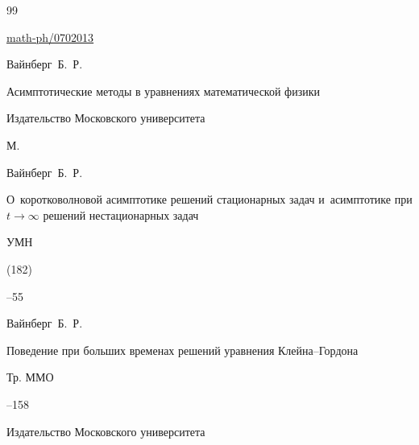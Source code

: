 \begin{thebibliography}{99}

\arxiv \href{https://arxiv.org/abs/math-ph/0702013}{math-ph/0702013}




\by Вайнберг~Б.~Р.

\book Асимптотические методы в уравнениях математической физики


\publ Издательство Московского университета

\publaddr М.






\by Вайнберг~Б.~Р.

\paper О~коротковолновой асимптотике решений стационарных задач и~асимптотике при $t\to\infty$ решений нестационарных задач

\jour УМН



(182)

--55














\by Вайнберг~Б.~Р.

\paper Поведение при больших временах решений уравнения Клейна--Гордона

\serial Тр. ММО



--158

\publ Издательство Московского университета


\end{thebibliography}
